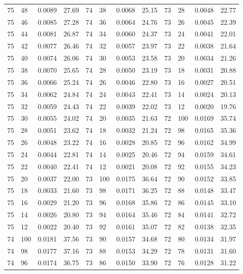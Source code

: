 \begin{tabular}{llll|llll|llll}
75 & 48 & 0.0089 & 27.69 & 74 & 38 & 0.0068 & 25.15 & 73 & 28 & 0.0048 & 22.77\\
75 & 46 & 0.0085 & 27.28 & 74 & 36 & 0.0064 & 24.76 & 73 & 26 & 0.0045 & 22.39\\
75 & 44 & 0.0081 & 26.87 & 74 & 34 & 0.0060 & 24.37 & 73 & 24 & 0.0041 & 22.01\\
75 & 42 & 0.0077 & 26.46 & 74 & 32 & 0.0057 & 23.97 & 73 & 22 & 0.0038 & 21.64\\
75 & 40 & 0.0074 & 26.06 & 74 & 30 & 0.0053 & 23.58 & 73 & 20 & 0.0034 & 21.26\\
75 & 38 & 0.0070 & 25.65 & 74 & 28 & 0.0050 & 23.19 & 73 & 18 & 0.0031 & 20.88\\
75 & 36 & 0.0066 & 25.24 & 74 & 26 & 0.0046 & 22.80 & 73 & 16 & 0.0027 & 20.51\\
75 & 34 & 0.0062 & 24.84 & 74 & 24 & 0.0043 & 22.41 & 73 & 14 & 0.0024 & 20.13\\
75 & 32 & 0.0059 & 24.43 & 74 & 22 & 0.0039 & 22.02 & 73 & 12 & 0.0020 & 19.76\\
75 & 30 & 0.0055 & 24.02 & 74 & 20 & 0.0035 & 21.63 & 72 & 100 & 0.0169 & 35.74\\
75 & 28 & 0.0051 & 23.62 & 74 & 18 & 0.0032 & 21.24 & 72 & 98 & 0.0165 & 35.36\\
75 & 26 & 0.0048 & 23.22 & 74 & 16 & 0.0028 & 20.85 & 72 & 96 & 0.0162 & 34.99\\
75 & 24 & 0.0044 & 22.81 & 74 & 14 & 0.0025 & 20.46 & 72 & 94 & 0.0159 & 34.61\\
75 & 22 & 0.0040 & 22.41 & 74 & 12 & 0.0021 & 20.08 & 72 & 92 & 0.0155 & 34.23\\
75 & 20 & 0.0037 & 22.00 & 73 & 100 & 0.0175 & 36.64 & 72 & 90 & 0.0152 & 33.85\\
75 & 18 & 0.0033 & 21.60 & 73 & 98 & 0.0171 & 36.25 & 72 & 88 & 0.0148 & 33.47\\
75 & 16 & 0.0029 & 21.20 & 73 & 96 & 0.0168 & 35.86 & 72 & 86 & 0.0145 & 33.10\\
75 & 14 & 0.0026 & 20.80 & 73 & 94 & 0.0164 & 35.46 & 72 & 84 & 0.0141 & 32.72\\
75 & 12 & 0.0022 & 20.40 & 73 & 92 & 0.0161 & 35.07 & 72 & 82 & 0.0138 & 32.35\\
74 & 100 & 0.0181 & 37.56 & 73 & 90 & 0.0157 & 34.68 & 72 & 80 & 0.0134 & 31.97\\
74 & 98 & 0.0177 & 37.16 & 73 & 88 & 0.0153 & 34.29 & 72 & 78 & 0.0131 & 31.60\\
74 & 96 & 0.0174 & 36.75 & 73 & 86 & 0.0150 & 33.90 & 72 & 76 & 0.0128 & 31.22\\

\end{tabular}
